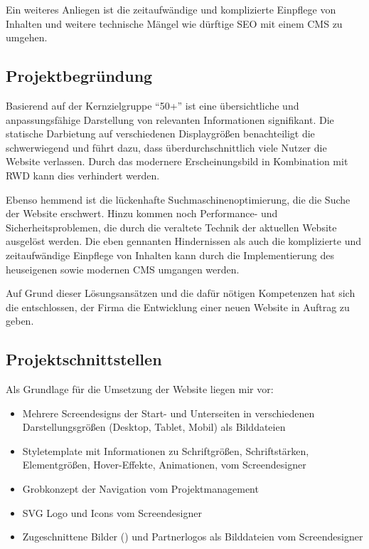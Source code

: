 Ein weiteres Anliegen ist die zeitaufwändige und komplizierte Einpflege von
Inhalten und weitere technische Mängel wie \zB dürftige \ac{SEO} mit einem
\ac{CMS} zu umgehen.


\subsection{Projektbegründung} 
\label{sec:Projektbegruendung}
Basierend auf der Kernzielgruppe "`50+"' ist eine übersichtliche und
anpassungsfähige Darstellung von relevanten Informationen signifikant. 
Die statische Darbietung auf verschiedenen Displaygrößen benachteiligt die
 schwerwiegend und führt dazu, dass
überdurchschnittlich viele Nutzer die Website verlassen. Durch das modernere
Erscheinungsbild in Kombination mit \ac{RWD} kann dies verhindert werden.
 
Ebenso hemmend ist die lückenhafte Suchmaschinenoptimierung, die die Suche
der Website erschwert. Hinzu kommen noch Performance- und
Sicherheitsproblemen, die durch die veraltete Technik der aktuellen Website
ausgelöst werden. Die eben gennanten Hindernissen als auch die komplizierte und
zeitaufwändige Einpflege von Inhalten kann durch die Implementierung des heuseigenen
sowie modernen \ac{CMS} \ct umgangen werden.

Auf Grund dieser Lösungsansätzen und die dafür nötigen Kompetenzen hat sich die
\kunde entschlossen, der Firma \mh die Entwicklung einer neuen Website in
Auftrag zu geben.

\subsection{Projektschnittstellen} 
\label{sec:Projektschnittstellen}



Als Grundlage für die Umsetzung der Website liegen mir vor:
\begin{itemize}
	\item Mehrere Screendesigns der Start- und Unterseiten in verschiedenen
Darstellungsgrößen (Desktop, Tablet, Mobil) als Bilddateien
	\item Styletemplate mit Informationen zu Schriftgrößen, Schriftstärken,
Elementgrößen, Hover-Effekte, Animationen, \usw vom Screendesigner
	\item Grobkonzept der Navigation vom Projektmanagement
	\item SVG Logo und Icons vom Screendesigner
	\item Zugeschnittene Bilder () und Partnerlogos als
	Bilddateien vom Screendesigner
\end{itemize}

